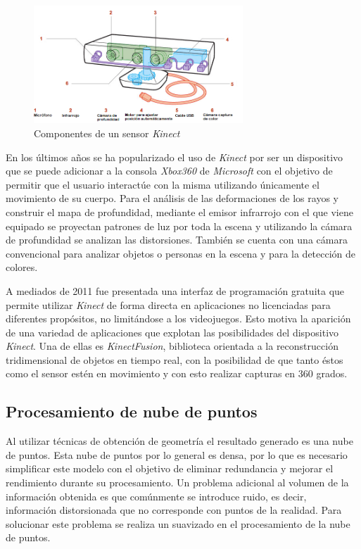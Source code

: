 \begin{figure}[H]
  \centering
    \includegraphics[width=0.7\textwidth]{./Cap2_videomapping/kinect.PNG}
  \caption[http://qph.cf.quoracdn.net/main-qimg-90d9a2ceb96f836e0b724027c2aba723]{Componentes de un sensor \emph{Kinect}}
  \label{fig:Kinect}
\end{figure}

En los últimos años se ha popularizado el uso de \emph{Kinect} por ser un dispositivo que se puede adicionar a la consola \emph{Xbox360} de \emph{Microsoft} con el objetivo de permitir que el usuario interactúe con la misma utilizando únicamente el movimiento de su cuerpo.
Para el análisis de las deformaciones de los rayos y construir el mapa de profundidad, mediante el emisor infrarrojo con el que viene equipado se proyectan patrones de luz por toda la escena y utilizando la cámara de profundidad se analizan las distorsiones. También se cuenta con una cámara convencional para analizar objetos o personas en la escena y para la detección de colores.

A mediados de 2011 fue presentada una interfaz de programación gratuita que permite utilizar \emph{Kinect} de forma directa en aplicaciones no licenciadas para diferentes propósitos, no limitándose a los videojuegos. Esto motiva la aparición de una variedad de aplicaciones que explotan las posibilidades del dispositivo \emph{Kinect}. Una de ellas es \emph{KinectFusion}\cite{KinectFusion}, biblioteca orientada a la reconstrucción tridimensional de objetos en tiempo real, con la posibilidad de que tanto éstos como el sensor estén en movimiento y con esto realizar capturas en 360 grados.

\subsection{Procesamiento de nube de puntos}

Al utilizar técnicas de obtención de geometría el resultado generado es una nube de puntos. Esta nube de puntos por lo general es densa, por lo que es necesario simplificar este modelo con el objetivo de eliminar redundancia y mejorar el rendimiento durante su procesamiento. Un problema adicional al volumen de la información obtenida es que comúnmente se introduce ruido, es decir, información distorsionada que no corresponde con puntos de la realidad. Para solucionar este problema se realiza un suavizado en el procesamiento de la nube de puntos\cite{PCloudSimplify}.

